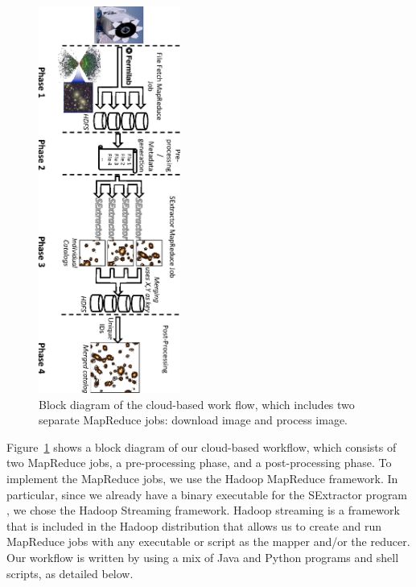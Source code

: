 \begin{figure}[t!]
	\centering
	\includegraphics[height=5.0in, angle=90]{part4/Farivar_O12/Diagram.eps}
	\caption{Block diagram of the cloud-based work flow, which includes two separate MapReduce jobs: download image  and  process image.}
	\label{bdiagram}
\end{figure}


Figure~\ref{bdiagram} shows a block diagram of our cloud-based workflow, which consists of two MapReduce jobs, a pre-processing phase, and a post-processing phase. To implement the MapReduce jobs, we use the Hadoop MapReduce framework. In particular, since we already have a binary executable for the SExtractor program \citep{Bertin1996}, we chose the Hadoop Streaming framework. Hadoop streaming is a framework that is included in the Hadoop distribution that allows us to create and run MapReduce jobs with any executable or script as the mapper and/or the reducer. Our workflow is written by using a mix of Java and Python programs and shell scripts, as detailed below.

